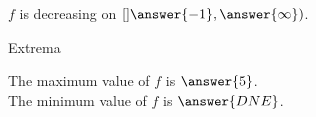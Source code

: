 \documentclass{ximera}
\begin{document}
\begin{exercise}
\begin{question}
$f$ is decreasing on $\left[] \answer{-1}, \answer{\infty} \right)$. \\

\end{question}









\begin{question} Extrema


The maximum value of $f$ is $\answer{5}$. \\

The minimum value of $f$ is $\answer{DNE}$. \\

\end{question}














\end{exercise}
\end{document}
